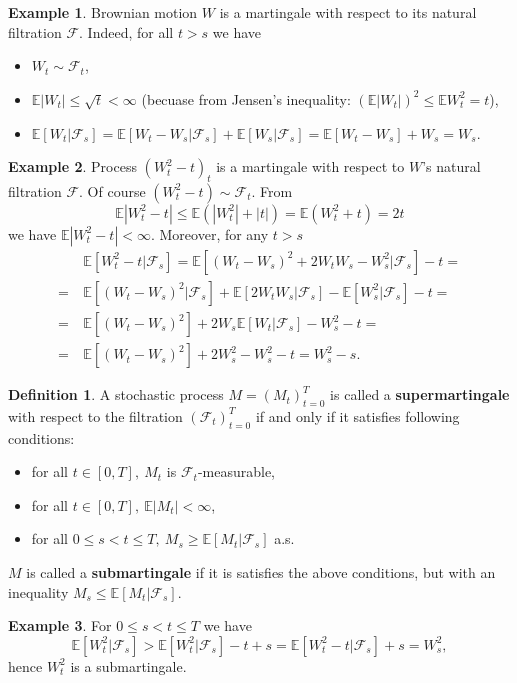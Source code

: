 \documentclass[a4paper,11pt, twoside]{book}
\theoremstyle{definition}
\newtheorem{mydef}{Definition}[chapter]
\newtheorem{example}{Example}[chapter]
\theoremstyle{remark}
\def\E{{\mathbb{E}}}
\begin{document}
\begin{example}
 Brownian motion $W$ is a martingale with respect to its natural filtration $\mathcal{F}$. Indeed, for all $t > s$ we have
 \begin{samepage}
  \begin{itemize}
  \item $W_t \sim \mathcal{F}_t$,
  \item $\E|W_t| \leq \sqrt{t} < \infty$ (becuase from Jensen's inequality: $(\E|W_t|)^2 \leq \E W_t^2 = t$),
  \item $\E[W_t|\mathcal{F}_s] = \E[W_t-W_s|\mathcal{F}_s] + \E[W_s|\mathcal{F}_s] = \E[W_t-W_s] + W_s = W_s$.
 \end{itemize}
 \end{samepage}

\end{example}
\begin{example}
 \label{ex:angleWt}
 Process $(W_t^2-t)_t$ is a martingale with respect to $W$'s natural filtration $\mathcal{F}$. Of course $(W_t^2-t) \sim \mathcal{F}_t$. From
 \[ \E|W_t^2-t| \leq \E(|W_t^2| + |t|) = \E(W_t^2 + t) = 2t\]
 we have $\E|W_t^2-t| < \infty$. Moreover, for any $t > s$
 \begin{equation*}
  \begin{split}
       & \E[W_t^2-t|\mathcal{F}_s] = \E[(W_t-W_s)^2 + 2W_tW_s - W_s^2|\mathcal{F}_s] -t =\\ 
    =\ & \E[(W_t-W_s)^2|\mathcal{F}_s] + \E[2W_tW_s|\mathcal{F}_s] - \E[W_s^2|\mathcal{F}_s] -t = \\
    =\ & \E[(W_t-W_s)^2] + 2W_s\E[W_t|\mathcal{F}_s] - W_s^2 -t = \\
    =\ & \E[(W_t-W_s)^2] + 2W_s^2 - W_s^2 -t = W_s^2 - s.
  \end{split}
 \end{equation*}
\end{example}

\begin{mydef}
 A stochastic process $M=(M_t)_{t=0}^T$ is called a \textbf{supermartingale} with respect to the filtration $(\mathcal{F}_t)_{t=0}^T$ if and only if it satisfies following conditions:
 \begin{itemize}
  \item for all $t \in [0,T],\ M_t$ is $\mathcal{F}_t$-measurable,
  \item for all $t \in [0,T],\ \E|M_t| < \infty$,
  \item for all $0 \leq s < t \leq T,\  M_s \geq \E[M_t|\mathcal{F}_s]$  a.s.
 \end{itemize}
 $M$ is called a \textbf{submartingale} if it is satisfies the above conditions, but with an inequality $ M_s \leq \E[M_t|\mathcal{F}_s]$.
\end{mydef}
\begin{example}
 For $0 \leq s < t \leq T$ we have
 \[ \E[W_t^2|\mathcal{F}_s] > \E[W_t^2|\mathcal{F}_s] - t + s = \E[W_t^2 - t|\mathcal{F}_s] + s = W_s^2, \]
 hence $W_t^2$ is a submartingale.
\end{example}
\end{document}
